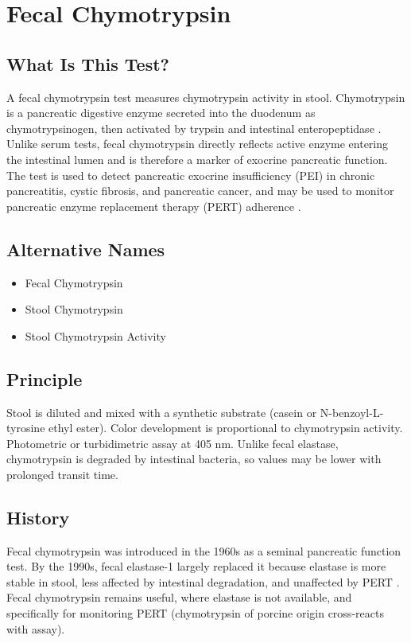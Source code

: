 \chapter{Fecal Chymotrypsin}

\section*{What Is This Test?}
A fecal chymotrypsin test measures chymotrypsin activity in stool. Chymotrypsin is a pancreatic digestive enzyme secreted into the duodenum as chymotrypsinogen, then activated by trypsin and intestinal enteropeptidase \cite{layer1999pancreatic}. Unlike serum tests, fecal chymotrypsin directly reflects active enzyme entering the intestinal lumen and is therefore a marker of exocrine pancreatic function. The test is used to detect pancreatic exocrine insufficiency (PEI) in chronic pancreatitis, cystic fibrosis, and pancreatic cancer, and may be used to monitor pancreatic enzyme replacement therapy (PERT) adherence \cite{bowles2003role}.

\section*{Alternative Names}
\begin{itemize}
  \item Fecal Chymotrypsin
  \item Stool Chymotrypsin
  \item Stool Chymotrypsin Activity
\end{itemize}
\section*{Principle}
Stool is diluted and mixed with a synthetic substrate (casein or N-benzoyl-L-tyrosine ethyl ester). Color development is proportional to chymotrypsin activity. Photometric or turbidimetric assay at 405 nm. Unlike fecal elastase, chymotrypsin is degraded by intestinal bacteria, so values may be lower with prolonged transit time.

\section*{History}
Fecal chymotrypsin was introduced in the 1960s as a seminal pancreatic function test. By the 1990s, fecal elastase-1 largely replaced it because elastase is more stable in stool, less affected by intestinal degradation, and unaffected by PERT \cite{sellers2021fecal}. Fecal chymotrypsin remains useful, where elastase is not available, and specifically for monitoring PERT (chymotrypsin of porcine origin cross-reacts with assay).


